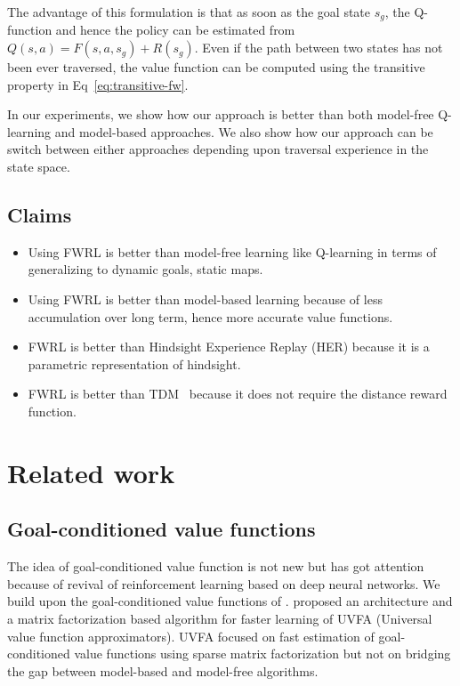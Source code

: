 \documentclass[letterpaper]{article} %
\def\state{s}
\def\act{a}
\def\Rew{R}
\begin{document}
The advantage of this formulation is that as soon as the goal state $\state_g$, the Q-function and
hence the policy can be estimated from $Q(\state, \act) = F(\state, \act, \state_g) + \Rew(\state_g)$.
Even if the path between two states has not been ever traversed, the value function
can be computed using the transitive property in Eq~\ref{eq:transitive-fw}. 

In our experiments, we show how our approach is better than both model-free Q-learning and model-based approaches. We also show how our approach can be switch between either approaches depending upon traversal experience in the state space.

\subsection{Claims}
\begin{itemize} \item
Using FWRL is better than model-free learning like Q-learning in terms of generalizing to dynamic goals, static maps.
\item 
Using FWRL is better than model-based learning because of less accumulation over long term, hence more accurate value functions.
\item FWRL is better than Hindsight Experience Replay (HER) \cite{andrychowicz2016learning} because it is a parametric representation of hindsight.
\item FWRL is better than TDM~\cite{pong2018temporal} because it does not require the distance reward function.
\end{itemize}

\section{Related work}
\subsection{Goal-conditioned value functions}
The idea of goal-conditioned value function is not new but has got attention because of revival of reinforcement learning based on deep neural networks.
We build upon the goal-conditioned value functions of \citet{schaul2015universal}.
\citet{schaul2015universal} proposed an architecture and a matrix factorization based algorithm for faster learning of UVFA (Universal value function approximators).
UVFA focused on fast estimation of goal-conditioned value functions using sparse
matrix factorization but not on bridging the gap between model-based and model-free
algorithms.
\end{document}
